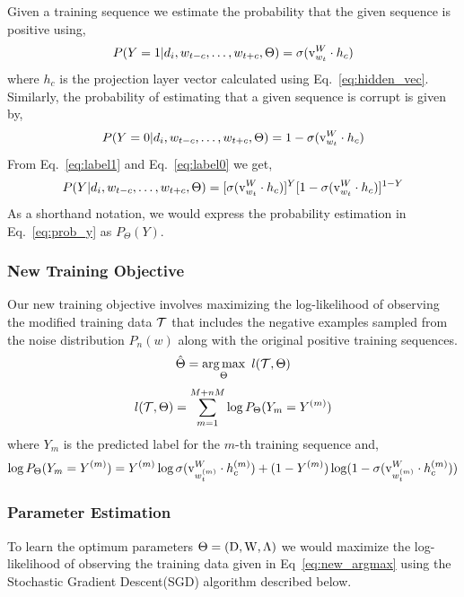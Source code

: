 Given a training sequence we estimate the probability that the given sequence is positive using,
\begin{equation}
\label{eq:label1}
P(Y=1|d_{i}, w_{t-c}, \ldots, w_{t+c}, \Theta) = \sigma(\mathrm{v}^{W}_{w_{t}} \cdot h_{c})
\end{equation}
where $h_{c}$ is the projection layer vector calculated using Eq.~\ref{eq:hidden_vec}. Similarly, the probability of estimating that a given sequence is corrupt is given by,
\begin{equation}
\label{eq:label0}
P(Y=0|d_{i}, w_{t-c}, \ldots, w_{t+c}, \Theta) = 1 - \sigma(\mathrm{v}^{W}_{w_{t}} \cdot h_{c})
\end{equation}
From Eq.~\ref{eq:label1} and Eq.~\ref{eq:label0} we get,
\begin{equation}
\label{eq:prob_y}
P(Y|d_{i}, w_{t-c}, \ldots, w_{t+c}, \Theta) = [\sigma(\mathrm{v}^{W}_{w_{t}} \cdot h_{c})]^{Y}[1 - \sigma(\mathrm{v}^{W}_{w_{t}} \cdot h_{c})]^{1-Y}
\end{equation}
As a shorthand notation, we would express the probability estimation in Eq.~\ref{eq:prob_y} as $P_{\Theta}(Y)$.

\subsubsection{New Training Objective}
Our new training objective involves maximizing the log-likelihood of observing the modified training data $\mathcal{T}$ that includes the negative examples sampled from the noise distribution $P_{n}(w)$ along with the original positive training sequences. 	
\begin{equation}
\label{eq:new_argmax}
\hat{\Theta} =  \operatorname*{arg\,max}_{\Theta}~l(\mathcal{T}, \Theta)
\end{equation}
\begin{equation}
\label{eq:new_training_objective}
l(\mathcal{T}, \Theta) = \sum_{m=1}^{M + nM} \log P_{\Theta}(Y_{m} = Y^{(m)})
\end{equation}
where $Y_{m}$ is the predicted label for the $m$-th training sequence and,
\begin{equation}
\label{eq:log_P}
\log P_{\Theta}(Y_{m} = Y^{(m)}) = Y^{(m)}\log \sigma(\mathrm{v}^{W}_{w^{(m)}_{t}} \cdot h^{(m)}_{c}) + (1 - Y^{(m)})\log (1 - \sigma(\mathrm{v}^{W}_{w^{(m)}_{t}} \cdot h^{(m)}_{c}))
\end{equation}

\subsubsection{Parameter Estimation}
To learn the optimum parameters $\Theta = (\mathrm{D}, \mathrm{W}, \Lambda)$ we would maximize the log-likelihood of observing the training data given in Eq~\ref{eq:new_argmax} using the Stochastic Gradient Descent(SGD) algorithm described below. 

